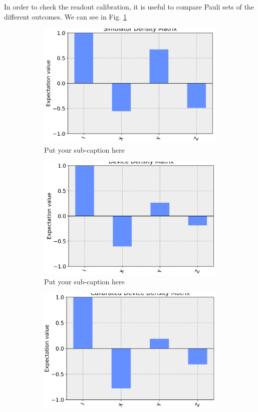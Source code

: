 In order to check the readout calibration, it is useful to compare Pauli sets of
the different outcomes. We can see in Fig. \ref{fig:tele_pauli_sim}

\begin{figure}
  \begin{subfigure}{.5\textwidth}
    \centering
    \includegraphics[width=.8\linewidth]{images/results/tele_pauli_sim.png}  
    \caption{Put your sub-caption here}
    \label{fig:tele_pauli_sim}
  \end{subfigure}
  \newline
  \begin{subfigure}{.5\textwidth}
    \centering
    \includegraphics[width=.8\linewidth]{images/results/tele_pauli_dev.png}  
    \caption{Put your sub-caption here}
    \label{fig:tele_pauli_dev}
  \end{subfigure}
  \newline
  \begin{subfigure}{.5\textwidth}
    \centering
    \includegraphics[width=.8\linewidth]{images/results/tele_pauli_cal.png}  

\end{subfigure}
\end{figure}
